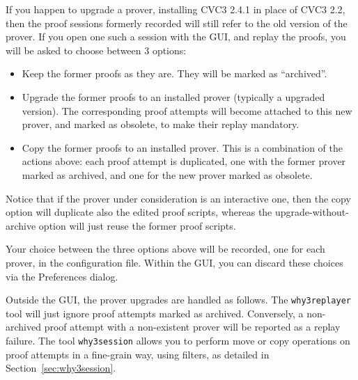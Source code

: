 If you happen to upgrade a prover, \eg installing CVC3 2.4.1 in place
of CVC3 2.2, then the proof sessions formerly recorded will still
refer to the old version of the prover. If you open one such a session
with the GUI, and replay the proofs, you will be asked to choose
between 3 options:
\begin{itemize}
\item Keep the former proofs as they are. They will be marked as
  ``archived''.
\item Upgrade the former proofs to an installed prover (typically a
  upgraded version). The corresponding proof attempts will become
  attached to this new prover, and marked as obsolete,
  to make their replay mandatory.
\item Copy the former proofs to an installed prover. This is a
  combination of the actions above: each proof attempt is duplicated,
  one with the former prover marked as archived, and one for the new
  prover marked as obsolete.
\end{itemize}

Notice that if the prover under consideration is an interactive one, then
the copy option will duplicate also the edited proof scripts, whereas
the upgrade-without-archive option will just reuse the former proof scripts.

Your choice between the three options above will be recorded, one for
each prover, in the \why configuration file. Within the GUI, you can
discard these choices via the \textsf{Preferences} dialog.

Outside the GUI, the prover upgrades are handled as follows. The
\texttt{why3replayer} tool will just ignore proof attempts marked as
archived.
Conversely, a non-archived proof attempt with a non-existent
prover will be reported as a replay failure. The tool
\texttt{why3session} allows you to perform move or copy operations on
proof attempts in a fine-grain way, using filters, as detailed in
Section~\ref{sec:why3session}.




